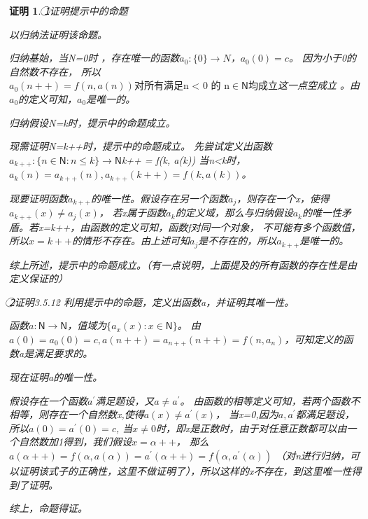 \documentclass{article}
\theoremstyle{mystyle}
\theoremstyle{zproofstyle}
\newtheorem*{zproof}{证明}
\begin{document}
\begin{zproof}
  \textcircled{1}证明提示中的命题

  以归纳法证明该命题。
  
  归纳基始，当N=0时 ，存在唯一的函数$a_0: \{0\} \rightarrow N$，$a_0(0)=c$。
  因为小于0的自然数不存在，
  所以$a_0(n++) = f(n,a(n)) \text{对所有满足n < 0 的 n} \in \mathsf{N} \text{均成立}$这一点空成立
  。由$a_0$的定义可知，$a_0$是唯一的。

  归纳假设N=k时，提示中的命题成立。

  现需证明N=k++时，提示中的命题成立。
  先尝试定义出函数$a_{k++}: \{n \in \mathsf{N}: n \leq k \} \rightarrow \mathsf{N}$k++ = f(k, a(k))
  当n<k时，$a_k(n) = a_{k++}(n), a_{k++}(k++) = f(k, a(k))$。
  
  现要证明函数$a_{k++}$的唯一性。假设存在另一个函数$a_j$，则存在一个x，使得$a_{k++}(x) \neq a_j(x)$，
  若x属于函数$a_k$的定义域，那么与归纳假设$a_k$的唯一性矛盾。若x=k++，由函数的定义可知，函数f对同一个对象，
  不可能有多个函数值，所以$x = k++$的情形不存在。由上述可知$a_j$是不存在的，所以$a_{k++}$是唯一的。

  综上所述，提示中的命题成立。（有一点说明，上面提及的所有函数的存在性是由定义保证的）

  \textcircled{2}证明3.5.12
  利用提示中的命题，定义出函数a，并证明其唯一性。

  函数$a: \mathsf{N} \rightarrow \mathsf{N}$，值域为$\{a_x(x): x \in \mathsf{N}\}$。
  由$a(0)=a_0(0)=c, a(n++) = a_{n++}(n++) = f(n, a_{n})$，可知定义的函数a是满足要求的。

  现在证明a的唯一性。

  假设存在一个函数$a^\prime$满足题设，又$a \neq a^\prime$。
  由函数的相等定义可知，若两个函数不相等，则存在一个自然数x,使得$a(x) \neq a^\prime(x)$，
  当x=0,因为$a, a^\prime $都满足题设，所以$a(0)=a^\prime(0)=c$,
  当$x \neq 0$时，即x是正数时，由于对任意正数都可以由一个自然数加1得到，我们假设$x = \alpha ++$，
  那么$a(\alpha ++) = f(\alpha, a(\alpha)) = a^\prime(\alpha ++) = f(\alpha, a^\prime (\alpha))$
  （对n进行归纳，可以证明该式子的正确性，这里不做证明了），所以这样的x不存在，到这里唯一性得到了证明。

  综上，命题得证。

\end{zproof}
\end{document}
